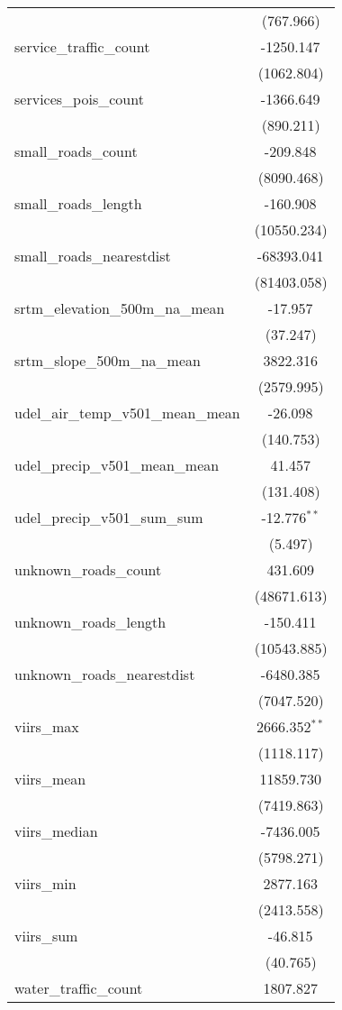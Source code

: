 \begin{table}[!htbp]
\begin{tabular}{@{\extracolsep{5pt}}lc}
  & (767.966) \\
 service_traffic_count & -1250.147$^{}$ \\
  & (1062.804) \\
 services_pois_count & -1366.649$^{}$ \\
  & (890.211) \\
 small_roads_count & -209.848$^{}$ \\
  & (8090.468) \\
 small_roads_length & -160.908$^{}$ \\
  & (10550.234) \\
 small_roads_nearestdist & -68393.041$^{}$ \\
  & (81403.058) \\
 srtm_elevation_500m_na_mean & -17.957$^{}$ \\
  & (37.247) \\
 srtm_slope_500m_na_mean & 3822.316$^{}$ \\
  & (2579.995) \\
 udel_air_temp_v501_mean_mean & -26.098$^{}$ \\
  & (140.753) \\
 udel_precip_v501_mean_mean & 41.457$^{}$ \\
  & (131.408) \\
 udel_precip_v501_sum_sum & -12.776$^{**}$ \\
  & (5.497) \\
 unknown_roads_count & 431.609$^{}$ \\
  & (48671.613) \\
 unknown_roads_length & -150.411$^{}$ \\
  & (10543.885) \\
 unknown_roads_nearestdist & -6480.385$^{}$ \\
  & (7047.520) \\
 viirs_max & 2666.352$^{**}$ \\
  & (1118.117) \\
 viirs_mean & 11859.730$^{}$ \\
  & (7419.863) \\
 viirs_median & -7436.005$^{}$ \\
  & (5798.271) \\
 viirs_min & 2877.163$^{}$ \\
  & (2413.558) \\
 viirs_sum & -46.815$^{}$ \\
  & (40.765) \\
 water_traffic_count & 1807.827$^{}$ \\

\end{tabular}
\end{table}
